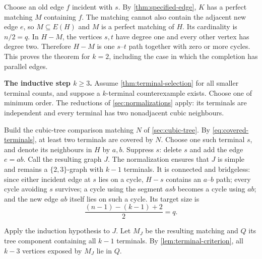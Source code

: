 \documentclass[a4paper,11pt]{article}
\numberwithin{equation}{section}
\begin{document}
Choose an old edge $f$ incident with $s$. By \cref{thm:specified-edge}, $K$ has
a perfect matching $M$ containing $f$. The matching cannot also contain the adjacent new edge $e$, so
$M\subseteq E(H)$ and $M$ is a perfect matching of $H$. Its cardinality is
$n/2=q$. In $H-M$, the vertices $s,t$ have degree one and every other vertex has
degree two. Therefore $H-M$ is one $s$--$t$ path together with zero or more
cycles. This proves the theorem for $k=2$, including the case in which the
completion has parallel edges.

\medskip\noindent\textbf{The inductive step $k\ge 3$.}
Assume \cref{thm:terminal-selection} for all smaller terminal counts, and suppose a $k$-terminal
counterexample exists. Choose one of minimum order. The reductions of
\cref{sec:normalizations} apply: its terminals are independent and every
terminal has two nonadjacent cubic neighbours.

Build the cubic-tree comparison matching $N$ of \cref{sec:cubic-tree}. By
\cref{eq:covered-terminals}, at least two terminals are covered by $N$. Choose
one such terminal $s$, and denote its neighbours in $H$ by $a,b$. Suppress $s$:
delete $s$ and add the edge $e=ab$. Call the resulting graph $J$. The
normalization ensures that $J$ is simple and remains a $\{2,3\}$-graph with
$k-1$ terminals. It is connected and bridgeless: since either incident edge at
$s$ lies on a cycle, $H-s$ contains an $a$--$b$ path; every cycle avoiding $s$
survives; a cycle using the segment $asb$ becomes a cycle using $ab$; and the
new edge $ab$ itself lies on such a cycle. Its target size is
\[
  \frac{(n-1)-(k-1)+2}{2}=q .
\]

Apply the induction hypothesis to $J$. Let $M_J$ be the resulting matching and
$Q$ its tree component containing all $k-1$ terminals. By
\cref{lem:terminal-criterion}, all $k-3$ vertices
exposed by $M_J$ lie in $Q$.
\end{document}
